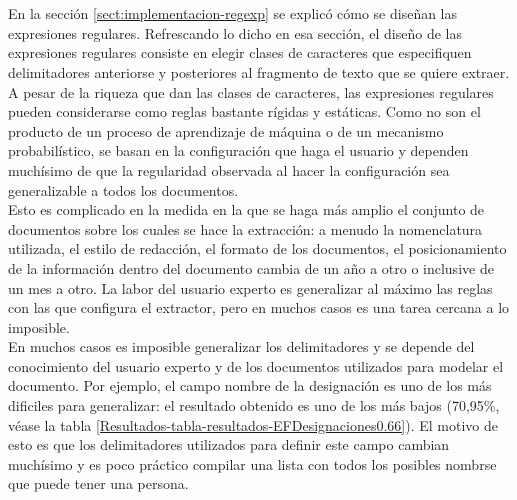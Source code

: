 \\
\\

En la sección \ref{sect:implementacion-regexp} se explicó cómo se diseñan las expresiones regulares. Refrescando lo dicho en esa sección, el diseño de las expresiones regulares consiste en elegir clases de caracteres que especifiquen delimitadores anteriorse y posteriores al fragmento de texto que se quiere extraer.  A pesar de la riqueza que dan las clases de caracteres,  las expresiones regulares pueden considerarse como reglas bastante rígidas y estáticas. Como no son el producto de un proceso de aprendizaje de máquina o de un mecanismo probabilístico, se basan en la configuración que haga el usuario y dependen muchísimo de que la regularidad observada al hacer la configuración sea generalizable a todos los documentos.\\ 

Esto es complicado en la medida en la que se haga más amplio el conjunto de documentos sobre los cuales se hace la extracción: a menudo la nomenclatura utilizada, el estilo de redacción, el formato de los documentos, el posicionamiento de la información dentro del documento cambia de un año a otro o inclusive de un mes a otro. La labor del usuario experto es generalizar al máximo las reglas con las que configura el extractor, pero en muchos casos es una tarea cercana a lo imposible.\\

En muchos casos es imposible generalizar los delimitadores y se depende del conocimiento del usuario experto y de los documentos utilizados para modelar el documento. Por ejemplo, el campo nombre de la designación es uno de los más dificiles para generalizar: el resultado obtenido es uno de los más bajos (70,95\%, véase la tabla \ref{Resultados-tabla-resultados-EFDesignaciones0.66}). El motivo de esto es que los delimitadores utilizados para definir este campo cambian muchísimo y es poco práctico compilar una lista con todos los posibles nombrse que puede tener una persona. \\

